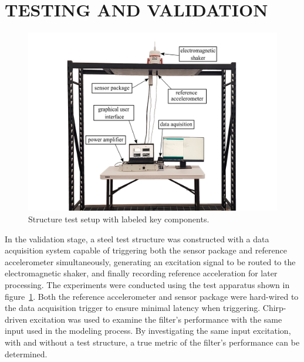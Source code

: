 \documentclass[]{spie}  %
\begin{document}
	
	\section{TESTING AND VALIDATION}
	


	\begin{figure} [H]
		\centering
		\includegraphics[width=6 in]{figures/structure experimental setup.png}
		\caption{Structure test setup with labeled key components.}
		\label{fig:structure experimental setup} 
	\end{figure}


	
	In the validation stage, a steel test structure was constructed with a data acquisition system capable of triggering both the sensor package and reference accelerometer simultaneously, generating an excitation signal to be routed to the electromagnetic shaker, and finally recording reference acceleration for later processing. The experiments were conducted using the test apparatus shown in figure~\ref{fig:structure experimental setup}. Both the reference accelerometer and sensor package were hard-wired to the data acquisition trigger to ensure minimal latency when triggering. Chirp-driven excitation was used to examine the filter’s performance with the same input used in the modeling process. By investigating the same input excitation, with and without a test structure, a true metric of the filter’s performance can be determined.  
		
\end{document}
